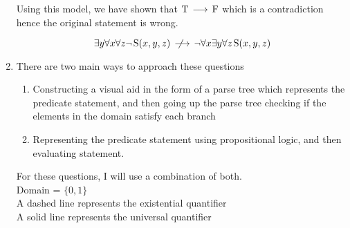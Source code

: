 \documentclass{article}
\newcommand{\True}{\textnormal{T}}
\newcommand{\False}{\textnormal{F}}
\newcommand{\predS}{\hspace{0.05cm} \textnormal{S}}
\newcommand{\predicate}{\predS (x,y,z)}
\newcommand{\impgap}{\hspace{0.05cm}}
\newcommand{\imp}{\impgap \longrightarrow \impgap}
\newcommand{\notimplies}{%
  \mathrel{{\ooalign{\hidewidth$\not\phantom{=}$\hidewidth\cr$\imp$}}}}
\begin{document}
\begin{enumerate}
{    Using this model, we have shown that $\True \imp \False$ which is a contradiction hence the original statement is wrong.
    
    $$\exists y \forall x \forall z \lnot \predicate \notimplies \lnot \forall x \exists y \forall z \predicate$$
    }
    \pagebreak

    \item
    {
    There are two main ways to approach these questions
    \begin{enumerate}[1.]
        \item
        Constructing a visual aid in the form of a parse tree which represents the predicate statement, and then going up the parse tree checking if the elements in the domain satisfy each branch
        \item
        Representing the predicate statement using propositional logic, and then evaluating statement.
    \end{enumerate}
    For these questions, I will use a combination of both. \\

    Domain = $\{0, 1\}$ \\
    A dashed line represents the existential quantifier \\
    A solid line represents the universal quantifier
    } \\
    

\end{enumerate}
\end{document}
